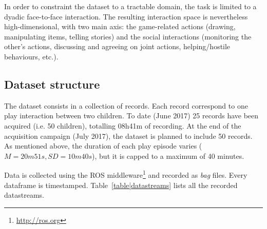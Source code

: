 \documentclass{article}
\newcommand{\ie}{i.e.\xspace}
\begin{document}
In order to constraint the dataset to a tractable domain, the task is limited to
a dyadic face-to-face interaction.  The resulting interaction space is
nevertheless high-dimensional, with two main axis: the game-related actions
(drawing, manipulating items, telling stories) and the social interactions
(monitoring the other's actions, discussing and agreeing on joint actions,
helping/hostile behaviours, etc.).

%
%
%
%
%



\subsection{Dataset structure}

The dataset consists in a collection of records. Each record correspond to one
play interaction between two children. To date (June 2017) 25 records have been
acquired (\ie 50 children), totalling 08h41m of recording. At the end of the acquisition campaign
(July 2017), the dataset is planned to include 50 records. As
mentioned above, the duration of each play episode varies ($M=20m51s,
SD=10m40s$), but it is capped to a maximum of 40 minutes.

Data is collected using the ROS middleware\footnote{\url{http://ros.org}} and
recorded as \emph{bag} files. Every dataframe is timestamped.
Table~\ref{table|datastreams} lists all the recorded datastreams.
\end{document}
